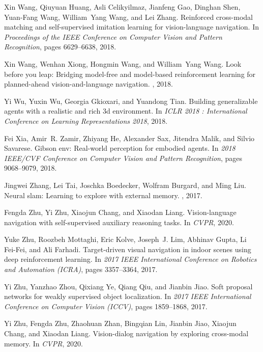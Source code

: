 \documentclass[final]{cvpr}
\begin{document}
\begin{thebibliography}{10}
    Xin {Wang}, Qiuyuan {Huang}, Asli {Celikyilmaz}, Jianfeng {Gao}, Dinghan
      {Shen}, Yuan-Fang {Wang}, William~Yang {Wang}, and Lei {Zhang}.
    \newblock Reinforced cross-modal matching and self-supervised imitation
      learning for vision-language navigation.
    \newblock In {\em Proceedings of the IEEE Conference on Computer Vision and
      Pattern Recognition}, pages 6629--6638, 2018.
    
    Xin {Wang}, Wenhan {Xiong}, Hongmin {Wang}, and William~Yang {Wang}.
    \newblock Look before you leap: Bridging model-free and model-based
      reinforcement learning for planned-ahead vision-and-language navigation.
    , 2018.
    
    Yi {Wu}, Yuxin {Wu}, Georgia {Gkioxari}, and Yuandong {Tian}.
    \newblock Building generalizable agents with a realistic and rich 3d
      environment.
    \newblock In {\em ICLR 2018 : International Conference on Learning
      Representations 2018}, 2018.
    
    Fei {Xia}, Amir~R. {Zamir}, Zhiyang {He}, Alexander {Sax}, Jitendra {Malik},
      and Silvio {Savarese}.
    \newblock Gibson env: Real-world perception for embodied agents.
    \newblock In {\em 2018 IEEE/CVF Conference on Computer Vision and Pattern
      Recognition}, pages 9068--9079, 2018.
    
    Jingwei {Zhang}, Lei {Tai}, Joschka {Boedecker}, Wolfram {Burgard}, and Ming
      {Liu}.
    \newblock Neural slam: Learning to explore with external memory.
    , 2017.
    
    Fengda {Zhu}, Yi {Zhu}, Xiaojun {Chang}, and Xiaodan {Liang}.
    \newblock Vision-language navigation with self-supervised auxiliary reasoning
      tasks.
    \newblock In {\em {CVPR}}, 2020.
    
    Yuke {Zhu}, Roozbeh {Mottaghi}, Eric {Kolve}, Joseph~J. {Lim}, Abhinav {Gupta},
      Li {Fei-Fei}, and Ali {Farhadi}.
    \newblock Target-driven visual navigation in indoor scenes using deep
      reinforcement learning.
    \newblock In {\em 2017 IEEE International Conference on Robotics and Automation
      (ICRA)}, pages 3357--3364, 2017.
    
    Yi {Zhu}, Yanzhao {Zhou}, Qixiang {Ye}, Qiang {Qiu}, and Jianbin {Jiao}.
    \newblock Soft proposal networks for weakly supervised object localization.
    \newblock In {\em 2017 IEEE International Conference on Computer Vision
      (ICCV)}, pages 1859--1868, 2017.
    
    Yi Zhu, Fengda Zhu, Zhaohuan Zhan, Bingqian Lin, Jianbin Jiao, Xiaojun Chang,
      and Xiaodan Liang.
    \newblock Vision-dialog navigation by exploring cross-modal memory.
    \newblock In {\em {CVPR}}, 2020.
    
    \end{thebibliography}
\end{document}
